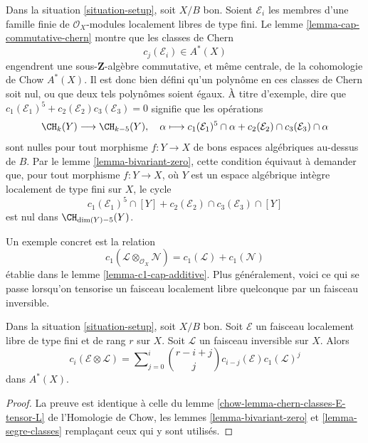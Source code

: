 \noindent
Dans la situation \ref{situation-setup}, soit $X/B$ bon. Soient
$\mathcal{E}_i$ les membres d'une famille finie de $\mathcal{O}_X$-modules
localement libres de type fini. Le lemme \ref{lemma-cap-commutative-chern}
montre que les classes de Chern
$$
c_j(\mathcal{E}_i) \in A^*(X)
$$
engendrent une sous-$\mathbf{Z}$-algèbre commutative, et même centrale, de la
cohomologie de Chow $A^*(X)$. Il est donc bien défini qu'un polynôme en ces
classes de Chern soit nul, ou que deux tels polynômes soient égaux. À titre
d'exemple, dire que $c_1(\mathcal{E}_1)^5 +
c_2(\mathcal{E}_2)c_3(\mathcal{E}_3) = 0$ signifie que les opérations
$$
\CH_k(Y) \longrightarrow \CH_{k - 5}(Y), \quad
\alpha \longmapsto
c_1(\mathcal{E}_1)^5 \cap \alpha +
c_2(\mathcal{E}_2) \cap c_3(\mathcal{E}_3) \cap \alpha
$$
sont nulles pour tout morphisme $f : Y \to X$ de bons espaces algébriques
au-dessus de $B$. Par le lemme \ref{lemma-bivariant-zero}, cette condition
équivaut à demander que, pour tout morphisme $f : Y \to X$, où $Y$ est un
espace algébrique intègre localement de type fini sur $X$, le cycle
$$
c_1(\mathcal{E}_1)^5 \cap [Y] +
c_2(\mathcal{E}_2) \cap c_3(\mathcal{E}_3) \cap [Y]
$$
est nul dans $\CH_{\dim(Y) - 5}(Y)$.

\medskip\noindent
Un exemple concret est la relation
$$
c_1(\mathcal{L} \otimes_{\mathcal{O}_X} \mathcal{N})
=
c_1(\mathcal{L}) + c_1(\mathcal{N})
$$
établie dans le lemme \ref{lemma-c1-cap-additive}. Plus généralement, voici ce
qui se passe lorsqu'on tensorise un faisceau localement libre quelconque par un
faisceau inversible.

\begin{lemma}
\label{lemma-chern-classes-E-tensor-L}
Dans la situation \ref{situation-setup}, soit $X/B$ bon. Soit $\mathcal{E}$ un
faisceau localement libre de type fini et de rang $r$ sur $X$. Soit
$\mathcal{L}$ un faisceau inversible sur $X$. Alors
\begin{equation}
\label{equation-twist}
c_i({\mathcal E} \otimes {\mathcal L})
=
\sum\nolimits_{j = 0}^i
\binom{r - i + j}{j} c_{i - j}({\mathcal E}) c_1({\mathcal L})^j
\end{equation}
dans $A^*(X)$.
\end{lemma}

\begin{proof}
La preuve est identique à celle du lemme
\ref{chow-lemma-chern-classes-E-tensor-L} de l'Homologie de Chow, les lemmes
\ref{lemma-bivariant-zero} et \ref{lemma-segre-classes} remplaçant ceux qui y
sont utilisés.
\end{proof}













